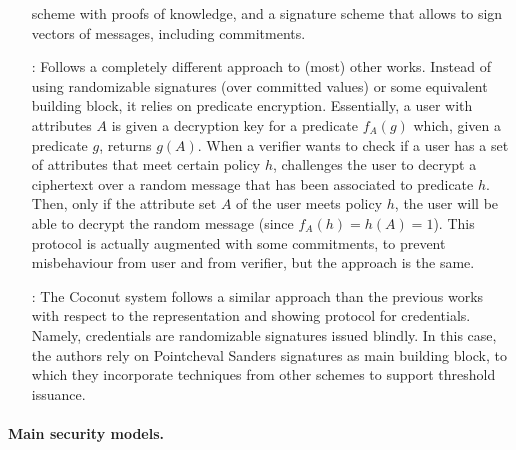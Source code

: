 \begin{enumerate}
  scheme with proofs of knowledge, and a signature scheme that allows to
  sign vectors of messages, including commitments.
\item[\cite{dmm+18}:] Follows a completely different approach to (most) other
  works. Instead of using randomizable signatures (over committed values) or
  some equivalent building block, it relies on predicate encryption.
  Essentially, a user with attributes $A$ is given a decryption key for a
  predicate $f_A(g)$ which, given a predicate $g$, returns $g(A)$. When
  a verifier wants to check if a user has a set of attributes that meet
  certain policy $h$, challenges the user to decrypt a ciphertext over
  a random message that has been associated to predicate $h$. Then, only
  if the attribute set $A$ of the user meets policy $h$, the user will be
  able to decrypt the random message (since $f_A(h) = h(A) = 1$). This
  protocol is actually augmented with some commitments, to prevent
  misbehaviour from user and from verifier, but the approach is the same.
\item[\cite{sms+19}:] The Coconut system follows a similar approach than the previous
  works with respect to the representation and showing protocol for credentials.
  Namely, credentials are randomizable signatures issued blindly. In this case,
  the authors rely on Pointcheval Sanders signatures \cite{ps16} as main
  building block, to which they incorporate techniques from other schemes to
  support threshold issuance.
\end{enumerate}

\paragraph{Main security models.}

